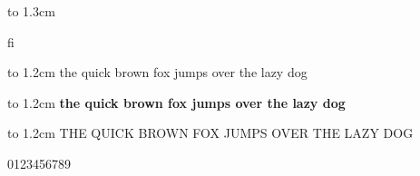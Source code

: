 \documentclass[10pt]{article}
\begin{document}
\vbox to 1.3cm{ %
{\LARGE fi} %

}

\vbox to 1.2cm{
the quick brown fox jumps over the lazy dog
}

\vbox to 1.2cm{
\bfseries the quick brown fox jumps over the lazy dog
}

\vbox to 1.2cm{
THE QUICK BROWN FOX JUMPS OVER THE LAZY DOG
}

\vbox{
0123456789
}
\end{document}
